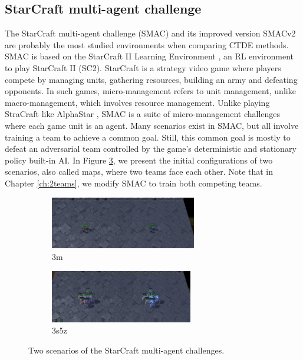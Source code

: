 \subsection{StarCraft multi-agent challenge}
The StarCraft multi-agent challenge (SMAC) \citep{samvelyan2019starcraft} and its improved version SMACv2 \citep{ellis2022smacv2} are probably the most studied environments when comparing CTDE methods.
SMAC is based on the StarCraft II Learning Environment \citep{vinyals2017starcraft}, an RL environment to play StarCraft II (SC2).
StarCraft is a strategy video game where players compete by managing units, gathering resources, building an army and defeating opponents.
In such games, micro-management refers to unit management, unlike macro-management, which involves resource management.
Unlike playing StraCraft like AlphaStar \citep{vinyals2019grandmaster}, SMAC is a suite of micro-management challenges where each game unit is an agent.
Many scenarios exist in SMAC, but all involve training a team to achieve a common goal.
Still, this common goal is mostly to defeat an adversarial team controlled by the game's deterministic and stationary policy built-in AI.
In Figure \ref{fig:ch3_smac}, we present the initial configurations of two scenarios, also called maps, where two teams face each other.
Note that in Chapter \ref{ch:2teams}, we modify SMAC to train both competing teams.

\begin{figure}
     \centering
     \begin{subfigure}[b]{0.5\textwidth}
         \centering
         \includegraphics[height=2.3cm]{tex_thesis/figures/ch3/3m_screen.pdf}
         \caption{3m}
         \label{fig:ch3_3m}
     \end{subfigure}%
     \begin{subfigure}[b]{0.5\textwidth}
         \centering
         \includegraphics[height=2.3cm]{tex_thesis/figures/ch3/3s5z_screen.pdf}
         \caption{3s5z}
         \label{fig:ch3_3s5z}
     \end{subfigure}
    \caption{Two scenarios of the StarCraft multi-agent challenges.}
    \label{fig:ch3_smac}
\end{figure}

